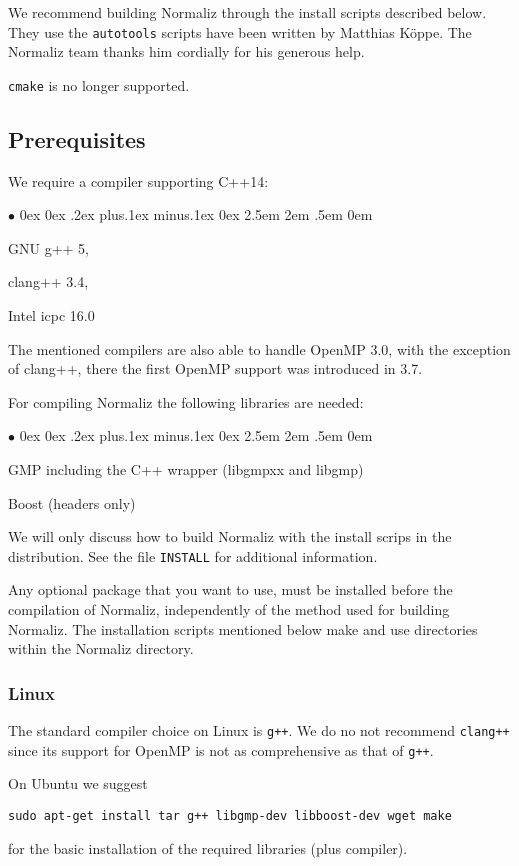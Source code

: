 \documentclass[12pt,a4paper]{scrartcl}
\newcommand{\stdli}{ \topsep0ex \partopsep0ex %
\parsep.2ex plus.1ex minus.1ex \itemsep0ex%
\leftmargin2.5em \labelwidth2em \labelsep.5em \rightmargin0em}%
\renewenvironment{itemize}{\begin{list}{{$\bullet$}}{\stdli}}{\end{list}}
\theoremstyle{definition}
\begin{document}
We recommend building Normaliz through the install scripts described below. They use the \verb|autotools| scripts have been written by Matthias K\"oppe. The Normaliz team thanks him cordially for his generous help.

\verb|cmake| is no longer supported. 

\subsection{Prerequisites}

We require a compiler supporting C++14:
\begin{itemize}
	\item GNU g++ 5,
	\item clang++ 3.4,
	\item Intel icpc 16.0
\end{itemize}
The mentioned compilers are also able to handle OpenMP 3.0, with the exception of clang++, there the first OpenMP support was introduced in 3.7.

For compiling Normaliz the following libraries are needed:
\begin{itemize}
	\item GMP including the C++ wrapper (libgmpxx and libgmp)
	\item Boost (headers only)
\end{itemize}

We will only discuss how to build Normaliz with the install scrips in the distribution. See the file \verb|INSTALL| for additional information. 

Any optional package that you want to use, must be installed before the compilation of Normaliz, independently of the method used for building Normaliz. The installation scripts mentioned below make and use directories within the Normaliz directory.

\subsubsection{Linux}
The standard compiler choice on Linux is \verb|g++|. We do no not recommend \verb|clang++| since its support for OpenMP is not as comprehensive as that of \verb|g++|.

On Ubuntu we suggest
\begin{Verbatim}
sudo apt-get install tar g++ libgmp-dev libboost-dev wget make
\end{Verbatim}
for the basic installation of the required libraries (plus compiler).
\end{document}
